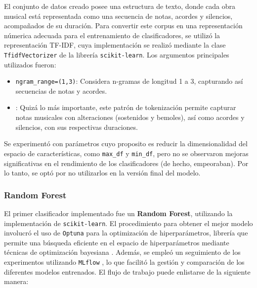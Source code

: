 \documentclass[paper=letter, fontsize=11pt, draft=false]{scrartcl}
\numberwithin{equation}{problemcounter} %
\numberwithin{figure}{problemcounter} %
\numberwithin{table}{problemcounter} %
\numberwithin{subsection}{problemcounter}
\begin{document}
El conjunto de datos creado posee una estructura de texto, donde cada obra musical está representada como una secuencia de notas, acordes y silencios, acompañados de su duración. Para convertir este corpus en una representación númerica adecuada para el entrenamiento de clasificadores, se utilizó la representación TF-IDF, cuya implementación se realizó mediante la clase \texttt{TfidfVectorizer} de la librería \texttt{scikit-learn}. Los argumentos principales utilizados fueron:
\begin{itemize}
    \item \texttt{ngram\_range=(1,3)}: Considera n-gramas de longitud 1 a 3, capturando así secuencias de notas y acordes.
    \item \texttt{}: Quizá lo más importante, este patrón de tokenización permite capturar notas musicales con alteraciones (sostenidos y bemoles), así como acordes y silencios, con sus respectivas duraciones.
\end{itemize}
 
Se experimentó con parámetros cuyo proposito es reducir la dimensionalidad del espacio de características, como \texttt{max\_df} y \texttt{min\_df}, pero no se observaron mejoras significativas en el rendimiento de los clasificadores (de hecho, empeoraban). Por lo tanto, se optó por no utilizarlos en la versión final del modelo.

\subsubsection{Random Forest}

El primer clasificador implementado fue un \textbf{Random Forest}, utilizando la implementación de \texttt{scikit-learn}. El procedimiento para obtener el mejor modelo involucró el uso de \texttt{Optuna} para la optimización de hiperparámetros, librería que permite una búsqueda eficiente en el espacio de hiperparámetros mediante técnicas de optimización bayesiana \cite{akiba2019optuna}. Además, se empleó un seguimiento de los experimentos utilizando \texttt{MLflow} \cite{Zaharia_Accelerating_the_Machine_2018}, lo que facilitó la gestión y comparación de los diferentes modelos entrenados. El flujo de trabajo puede enlistarse de la siguiente manera:
\end{document}
